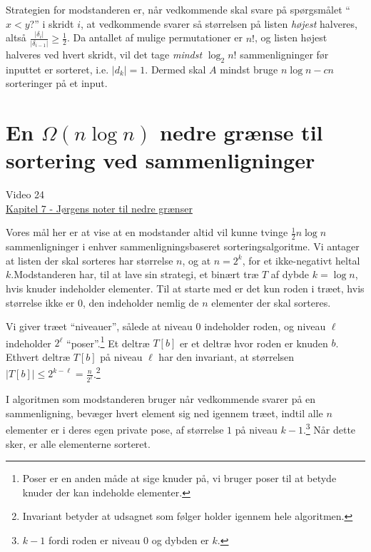 Strategien for modstanderen er, når vedkommende skal svare på spørgsmålet ``$x < y$?'' i skridt $i$, at vedkommende svarer så størrelsen på listen \textit{højest} halveres, altså $\frac{|\delta_{i}|}{|\delta_{i-1}|} \ge \frac{1}{2}$. Da antallet af mulige permutationer er $n!$, og listen højest halveres ved hvert skridt, vil det tage \textit{mindst} $\log_{2}n!$ sammenligninger før inputtet er sorteret, i.e. $|d_{k}| = 1$. Dermed skal $A$ mindst bruge $n \log n - cn$ sorteringer på et input.



\section{En $\Omega (n \log n)$ nedre grænse til sortering ved sammenligninger}%
\label{sec:sorteringsalgoritmesammenligninger}

\begin{note}[Kilder]
	Video 24 \\
	\href{https://imada.sdu.dk/u/jbj/DM553/LBnoteJBJ21.pdf}{Kapitel 7 - Jørgens noter til nedre grænser}
\end{note}

Vores mål her er at vise at en modstander altid vil kunne tvinge $\frac{1}{2}n \log n$ sammenligninger i enhver sammenligningsbaseret sorteringsalgoritme. Vi antager at listen der skal sorteres har størrelse $n$, og at $n = 2^{k}$, for et ikke-negativt heltal $k$.Modstanderen har, til at lave sin strategi, et binært træ $T$ af dybde $k = \log n$, hvis knuder indeholder elementer. Til at starte med er det kun roden i træet, hvis størrelse ikke er 0, den indeholder nemlig de $n$ elementer der skal sorteres.

Vi giver træet ``niveauer'', sålede at niveau 0 indeholder roden, og niveau $\ell$ indeholder $2^{\ell}$ ``poser''.\footnote{Poser er en anden måde at sige knuder på, vi bruger poser til at betyde knuder der kan indeholde elementer.} Et deltræ $T[b]$ er et deltræ hvor roden er knuden $b$. Ethvert deltræ $T[b]$ på niveau $\ell$ har den invariant, at størrelsen $|T[b]| \le 2^{k-\ell} = \frac{n}{2^{\ell}}$.\footnote{Invariant betyder at udsagnet som følger holder igennem hele algoritmen.}

I algoritmen som modstanderen bruger når vedkommende svarer på en sammenligning, bevæger hvert element sig ned igennem træet, indtil alle $n$ elementer er i deres egen private pose, af størrelse $1$ på niveau $k-1$.\footnote{$k-1$ fordi roden er niveau $0$ og dybden er $k$.} Når dette sker, er alle elementerne sorteret.

